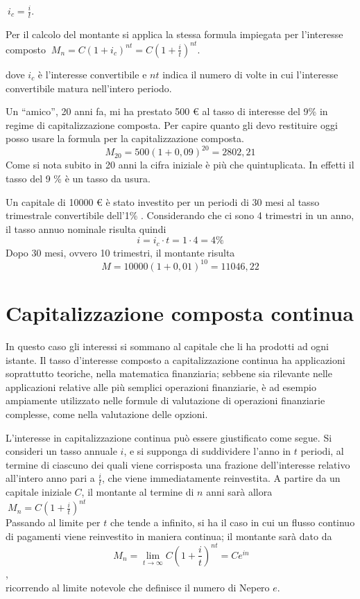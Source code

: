 \(\ i_c = \frac{i}{t}\).

Per il calcolo del montante si applica la stessa formula impiegata per 
l'interesse composto
\(\ M_n = C (1+i_c)^{nt} = C \left(1+\frac{i}{t}\right)^{nt}\).

dove \(i_c\) è l'interesse convertibile e \(nt\) indica il numero di volte in cui 
l'interesse convertibile matura nell'intero periodo.

\begin{exrig}
\begin{esempio}
Un ``amico'', 20 anni fa, mi ha prestato 500 € al tasso di interesse del 9\% in 
regime di capitalizzazione composta. Per capire quanto gli devo restituire oggi 
posso usare la formula per la capitalizzazione composta.
\[M_{20} = 500(1+0,09)^{20} = 2802,21\] 
Come si nota subito in 20 anni la cifra iniziale è più che quintuplicata. In 
effetti il tasso del 9 \% è un tasso da usura. 
\end{esempio}
\begin{esempio}
Un capitale di 10000 € è stato investito per un periodi di 30 mesi al tasso 
trimestrale convertibile dell'1\% . Considerando che ci sono 4 trimestri in un 
anno, il tasso annuo nominale risulta quindi
\[i=i_c\cdot t=1\cdot 4=4\%\]
Dopo 30 mesi, ovvero 10 trimestri, il montante risulta
\[M=10000(1+0,01)^{10}=11046,22\]
\end{esempio}
\end{exrig}

\section{Capitalizzazione composta continua}

In questo caso gli interessi si sommano al capitale che li ha prodotti ad ogni 
istante. Il tasso d'interesse composto a capitalizzazione continua ha 
applicazioni soprattutto teoriche, nella matematica finanziaria; sebbene sia 
rilevante nelle applicazioni relative alle più semplici operazioni finanziarie, 
è ad esempio ampiamente utilizzato nelle formule di valutazione di operazioni 
finanziarie complesse, come nella valutazione delle opzioni.

L'interesse in capitalizzazione continua può essere giustificato come segue. Si 
consideri un tasso annuale \(i\), e si supponga di suddividere l'anno in \(t\) 
periodi, al termine di ciascuno dei quali viene corrisposta una frazione 
dell'interesse relativo all'intero anno pari a \(\frac{i}{t}\), che viene 
immediatamente reinvestita. A partire da un capitale iniziale \(C\), il montante 
al termine di \(n\) anni sarà allora
\\[4pt]
\(\ M_n=C\left(1+\frac{i}{t}\right)^{nt}\)
\\[4pt]
Passando al limite per \(t\) che tende a infinito, si ha il caso in cui un flusso 
continuo di pagamenti viene reinvestito in maniera continua; il montante sarà 
dato da
\\[4pt]
\[\ M_n = \lim_{t\to\infty} C\left(1+\frac{i}{t}\right)^{nt} = Ce^{in}\],
\\[4pt]
ricorrendo al limite notevole che definisce il numero di Nepero \(e\).

